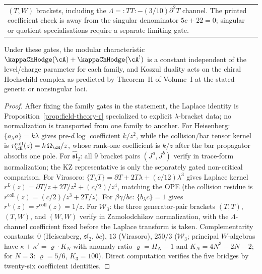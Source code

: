 \begin{proposition}
\begin{center}
\begin{tabular}{p{}p{}}
$(T,W)$ brackets, including the $\Lambda={:}TT{:}-(3/10)\partial^2T$
channel.  The printed coefficient check is away from the singular
denominator $5c+22=0$; singular or quotient specialisations require a
separate limiting gate. \\
\end{tabular}
\end{center}
Under these gates, the modular characteristic
$\kappaChHodge(\cA) + \kappaChHodge(\cA^!)$ is a constant independent
of the level/charge parameter for each family, and Koszul duality acts
on the chiral Hochschild complex as predicted by Theorem~H of Volume~I
at the stated generic or nonsingular loci.
\end{proposition}

\begin{proof}
After fixing the family gates in the statement, the Laplace identity is
Proposition~\ref{prop:field-theory-r} specialized to explicit
$\lambda$-bracket data; no normalization is transported from one family
to another.
For Heisenberg: $\{a_\lambda a\} = k\lambda$ gives
pre-\textup{\(d\log\)} coefficient $k/z^2$, while the
collision/bar tensor kernel is
$r^{\mathrm{coll}}_{\cH}(z)=k\,\Omega_{\cH}/z$, whose rank-one
coefficient is $k/z$ after the bar propagator absorbs one pole.
For $\widehat{\mathfrak{sl}}_2$: all $9$ bracket pairs
$(J^a, J^b)$ verify in trace-form normalization; the KZ representative
is only the separately gated non-critical comparison.
For Virasoro: $\{T_\lambda T\} = \partial T + 2T\lambda
+ (c/12)\lambda^3$ gives Laplace kernel $r^L(z) = \partial T/z + 2T/z^2
+ (c/2)/z^4$, matching the OPE
(the collision residue is $r^{\mathrm{coll}}(z) = (c/2)/z^3 + 2T/z$).
For $\beta\gamma$/$bc$: $\{b_\lambda c\} = 1$ gives
$r^L(z)=r^{\mathrm{coll}}(z)=1/z$.
For $\mathcal{W}_3$: the three generator-pair brackets
$(T,T)$, $(T,W)$, and $(W,W)$ verify in Zamolodchikov normalization,
with the $\Lambda$-channel coefficient fixed before the Laplace
transform is taken.
Complementarity constants: $0$ (Heisenberg, $\mathfrak{sl}_2$,
$bc$), $13$ (Virasoro), $250/3$ ($\mathcal{W}_3$; principal
$W$-algebras have $\kappa + \kappa' = \varrho \cdot K_N$
with anomaly ratio $\varrho = H_N - 1$ and
$K_N = 4N^3 - 2N - 2$; for $N = 3$:
$\varrho = 5/6$, $K_3 = 100$).
Direct computation verifies the five bridges by twenty-six coefficient
identities.
\end{proof}

